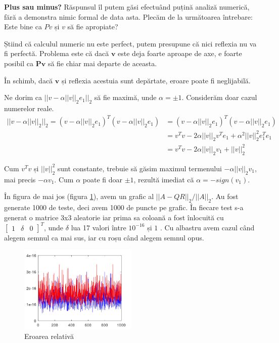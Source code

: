 \documentclass{exam}
\begin{document}
\textbf{Plus sau minus?} Răspunsul îl putem găsi efectuând puțină analiză
numerică, fără a demonstra nimic formal de data asta. Plecăm de la următoarea
întrebare: Este bine ca $Pv$ și $v$ să fie apropiate?

Știind că calculul numeric nu este perfect, putem presupune că nici
reflexia nu va fi perfectă. Problema este că dacă $\mathbf{v}$ este deja foarte
aproape de axe, e foarte posibil ca $\mathbf{Pv}$ să fie chiar mai departe de
aceasta.

În schimb, dacă $\mathbf{v}$ și reflexia acestuia sunt depărtate,
eroare poate fi neglijabilă.

Ne dorim ca $||v - \alpha ||v||_2 e_1||_2$ să fie maximă, unde
$\alpha = \pm 1$. Considerăm doar cazul numerelor reale.
\begin{align*}
	||v - \alpha ||v||_2||_2 = (v - \alpha ||v||_2 e_1)^T (v - \alpha ||v||_2 e_1) & = (v - \alpha ||v||_2 e_1)^T(v - \alpha ||v||_2 e_1)           \\
	                                                                               & = v^Tv - 2 \alpha ||v||_2 v^Te_1 + \alpha^2 ||v||_2^2 e_1^Te_1 \\
	                                                                               & = v^Tv - 2 \alpha ||v||_2 v_1 + ||v||_2^2
\end{align*}

Cum $v^Tv$ și $||v||_2^2$ sunt constante, trebuie să găsim maximul
termenului $- \alpha ||v||_2 v_1$, mai precis $- \alpha v_1$. Cum $\alpha$ poate
fi doar $\pm 1$, rezultă imediat că $\alpha = -sign(v_1)$.

\newpage
În figura de mai jos (figura \ref{fig:5}), avem un grafic al
$||A - QR||_2 / ||A||_2$. Au fost generate 1000 de teste, deci avem 1000 de puncte pe
grafic. În fiecare test s-a generat o matrice 3x3 aleatorie iar prima sa coloană
a fost înlocuită cu $\begin{bmatrix} 1 & \delta & 0 \end{bmatrix}^T$, unde
$\delta$ lua 17 valori între $10^{-16}$ și $1$ \cite{overton2023}. Cu albastru
avem cazul când alegem semnul ca mai sus, iar cu roșu când alegem semnul opus.

\begin{figure}[ht]
	\centering
	\includegraphics[width=0.5\textwidth]{hbad}
	\caption{Eroarea relativă}
	\label{fig:5}
\end{figure}
\end{document}

